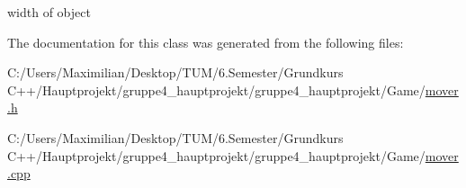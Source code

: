 width of object 



The documentation for this class was generated from the following files\+:\begin{DoxyCompactItemize}
\item 
C\+:/\+Users/\+Maximilian/\+Desktop/\+T\+U\+M/6.\+Semester/\+Grundkurs C++/\+Hauptprojekt/gruppe4\+\_\+hauptprojekt/gruppe4\+\_\+hauptprojekt/\+Game/\hyperlink{mover_8h}{mover.\+h}\item 
C\+:/\+Users/\+Maximilian/\+Desktop/\+T\+U\+M/6.\+Semester/\+Grundkurs C++/\+Hauptprojekt/gruppe4\+\_\+hauptprojekt/gruppe4\+\_\+hauptprojekt/\+Game/\hyperlink{mover_8cpp}{mover.\+cpp}\end{DoxyCompactItemize}
